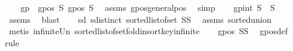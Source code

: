 \begin{isabellebody}
%
\isadelimproof
%
\endisadelimproof
%
\isatagproof
{}\isamarkupfalse%
{\isacharminus}{\kern0pt}\isanewline
\ \ \isamarkupfalse%
\ gp{}{}{\isacharcolon}{\kern0pt}\ \ {\isachardoublequoteopen}gpos\ S{}{\isachardoublequoteclose}\ {\isachardoublequoteopen}gpos\ S{}{\isachardoublequoteclose}\ \isamarkupfalse%
\ assms{\isacharparenleft}{\kern0pt}{}{\isacharcomma}{\kern0pt}{}{\isacharparenright}{\kern0pt}\ gpos{\isacharunderscore}{\kern0pt}generalpos\ \isamarkupfalse%
\ simp{\isacharplus}{\kern0pt}\isanewline
\ \ \isamarkupfalse%
\ gpint{\isacharcolon}{\kern0pt}\ {\isachardoublequoteopen}S{}\ {\isasyminter}\ S{}\ {\isacharequal}{\kern0pt}\ {\isacharbraceleft}{\kern0pt}{\isacharbraceright}{\kern0pt}{\isachardoublequoteclose}\ \isamarkupfalse%
\ assms{\isacharparenleft}{\kern0pt}{}{\isacharparenright}{\kern0pt}\ \isamarkupfalse%
\ blast\isanewline
\ \ \isamarkupfalse%
\ sd{\isacharcolon}{\kern0pt}\ {\isachardoublequoteopen}sdistinct\ {\isacharparenleft}{\kern0pt}sorted{\isacharunderscore}{\kern0pt}list{\isacharunderscore}{\kern0pt}of{\isacharunderscore}{\kern0pt}set\ {\isacharparenleft}{\kern0pt}S{}{\isasymunion}S{}{\isacharparenright}{\kern0pt}{\isacharparenright}{\kern0pt}{\isachardoublequoteclose}\ \isamarkupfalse%
\ assms{\isacharparenleft}{\kern0pt}{}{\isacharcomma}{\kern0pt}{}{\isacharcomma}{\kern0pt}{}{\isacharparenright}{\kern0pt}\ sorted{\isacharunderscore}{\kern0pt}union\isanewline
\ \ \ \ \isamarkupfalse%
\ {\isacharparenleft}{\kern0pt}metis\ infinite{\isacharunderscore}{\kern0pt}Un\ sorted{\isacharunderscore}{\kern0pt}list{\isacharunderscore}{\kern0pt}of{\isacharunderscore}{\kern0pt}set{\isachardot}{\kern0pt}fold{\isacharunderscore}{\kern0pt}insort{\isacharunderscore}{\kern0pt}key{\isachardot}{\kern0pt}infinite{\isacharparenright}{\kern0pt}\isanewline
\ \ \isamarkupfalse%
\ {\isachardoublequoteopen}gpos\ {\isacharparenleft}{\kern0pt}S{}{\isasymunion}S{}{\isacharparenright}{\kern0pt}{\isachardoublequoteclose}\ \isamarkupfalse%
\ gpos{\isacharunderscore}{\kern0pt}def\isanewline
\ \ \isamarkupfalse%
{\isacharparenleft}{\kern0pt}rule{\isacharplus}{\kern0pt}{\isacharparenright}{\kern0pt}\isanewline
\ \ \ \ \isamarkupfalse%

\end{isabellebody}
